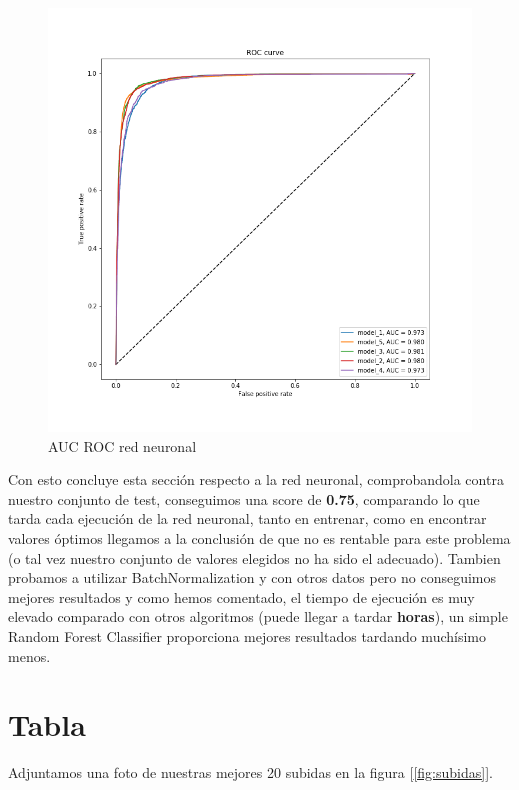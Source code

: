 \documentclass[12pt,twoside]{report}
\begin{document}
\begin{figure}[H]
\includegraphics[width=\textwidth]{../notebooks/figures/roc_nn.png}
\caption{AUC ROC red neuronal}
\label{fig:nn_auc}
\end{figure} 

Con esto concluye esta sección respecto a la red neuronal, comprobandola contra nuestro conjunto de test, conseguimos una score de \textbf{0.75}, comparando lo que tarda cada ejecución de la red neuronal, tanto en entrenar, como en encontrar valores óptimos llegamos a la conclusión de que no es rentable para este problema (o tal vez nuestro conjunto de valores elegidos no ha sido el adecuado). Tambien probamos a utilizar BatchNormalization y con otros datos pero no conseguimos mejores resultados y como hemos comentado, el tiempo de ejecución es muy elevado comparado con otros algoritmos (puede llegar a tardar \textbf{horas}), un simple Random Forest Classifier proporciona mejores resultados tardando muchísimo menos.

\section*{Tabla}

Adjuntamos una foto de nuestras mejores 20 subidas en la figura [\ref{fig:subidas}].
\end{document}
